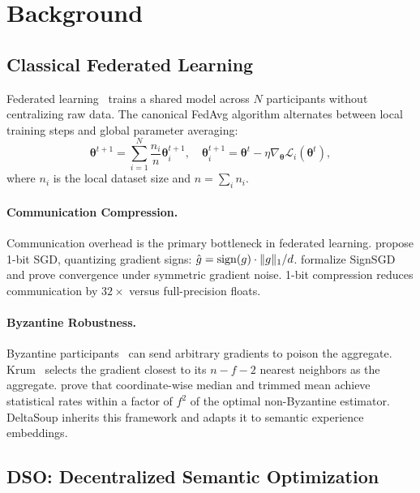 \section{Background}

\label{sec:background}

\subsection{Classical Federated Learning}

Federated learning~\cite{mcmahan2017communication} trains a shared model
across $N$ participants without centralizing raw data. The canonical
FedAvg algorithm alternates between local training steps and global parameter
averaging:
\begin{equation}
    \bm{\theta}^{t+1} = \sum_{i=1}^{N} \frac{n_i}{n} \bm{\theta}_i^{t+1},
    \quad \bm{\theta}_i^{t+1} = \bm{\theta}^t - \eta \nabla_{\bm{\theta}} \mathcal{L}_i(\bm{\theta}^t),
\end{equation}
where $n_i$ is the local dataset size and $n = \sum_i n_i$.

\paragraph{Communication Compression.}
Communication overhead is the primary bottleneck in federated learning.
\cite{seide20141bit} propose 1-bit SGD, quantizing gradient signs:
$\hat{g} = \operatorname{sign}(g) \cdot \|g\|_1 / d$.
\cite{bernstein2018signsgd} formalize SignSGD and prove convergence under
symmetric gradient noise. 1-bit compression reduces communication by $32\times$
versus full-precision floats.

\paragraph{Byzantine Robustness.}
Byzantine participants~\cite{lamport1982byzantine} can send arbitrary
gradients to poison the aggregate. Krum~\cite{blanchard2017machine} selects the
gradient closest to its $n - f - 2$ nearest neighbors as the aggregate.
\cite{yin2018byzantine} prove that coordinate-wise median and trimmed mean
achieve statistical rates within a factor of $f^2$ of the optimal non-Byzantine
estimator. DeltaSoup inherits this framework and adapts it to semantic
experience embeddings.

\subsection{DSO: Decentralized Semantic Optimization}

